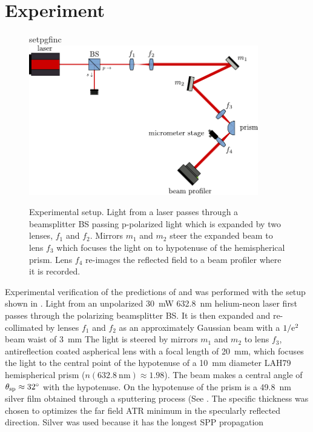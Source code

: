 \section{Experiment}
\begin{figure}[ht]
 \centering
 {setpgfinc}
 \includegraphics[keepaspectratio,width=10cm]{interference/figures/opticalsetup.pdf}
 \caption{Experimental setup.  Light from a laser passes
 through a beamsplitter BS passing p-polarized light which is expanded by two lenses, $f_1$ and $f_2$.
 Mirrors $m_1$ and $m_2$ steer the expanded beam to lens $f_3$ which
	focuses the light on to hypotenuse of the hemispherical prism.  Lens $f_4$ re-images the reflected
 field to a beam profiler where it is recorded.}
 \label{fig:opticalsetup}
\end{figure}
Experimental verification of the predictions of 
and  was performed with the setup shown in
.  Light from an
unpolarized \SI{30}{\milli\watt} \SI{632.8}{\nano\meter} helium-neon
laser first passes through the polarizing
beamsplitter BS.  It is then expanded and re-collimated by lenses $f_1$ and $f_2$ as an
approximately Gaussian beam with a $1/{\mathrm{e}}^2$ beam waist of
\SI{3}{\milli\meter} The light is steered by mirrors $m_1$ and $m_2$ to
lens $f_3$, antireflection coated aspherical lens with a focal length of
\SI{20}{\milli\meter}, which
focuses the light to the central point of the hypotenuse of a
\SI{10}{\milli\meter} diameter LAH79 hemispherical prism
($n(\SI{632.8}{\nano\meter})\approx1.98$).  The beam makes a central angle
of $\theta_\mathrm{sp}\approx\SI{32}{\degree}$ with the hypotenuse.
On the hypotenuse of the prism is a \SI{49.8}{\nano\meter} silver film
obtained through a sputtering process (See .
The specific thickness was chosen to
optimizes the far field ATR minimum in the specularly reflected
direction.  Silver was used because it has the longest SPP propagation

